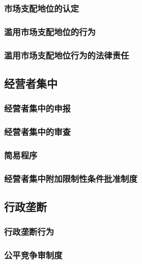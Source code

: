 \documentclass[UTF8,12pt]{ctexart}
\numberwithin{equation}{section} %
\numberwithin{figure}{section}
\numberwithin{table}{section}
\begin{document}
	\subsubsection{市场支配地位的认定}
	
	\subsubsection{滥用市场支配地位的行为}
	
	\subsubsection{滥用市场支配地位行为的法律责任}
	
	\subsection{经营者集中}
	
	\subsubsection{经营者集中的申报}
	
	\subsubsection{经营者集中的审查}
	
	\subsubsection{简易程序}
	
	\subsubsection{经营者集中附加限制性条件批准制度}
	
	\subsection{行政垄断}
	
	\subsubsection{行政垄断行为}
	
	\subsubsection{公平竞争审制度}
	
\end{document}
